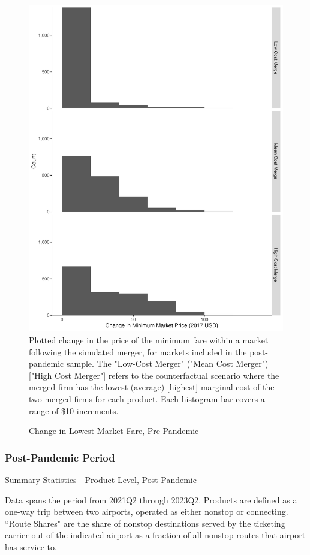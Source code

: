 \documentclass{article}
\begin{document}
\begin{appendices}
	
	\begin{figure}
		\caption{Change in Lowest Market Fare, Pre-Pandemic}
		\label{fig:LowestMarketChange_Pre}
		\includegraphics[width = \linewidth]{PrePandemic_Merger_Change_MinimumFare}
		\footnotesize{Plotted change in the price of the minimum fare within a market following the simulated merger, for markets included in the post-pandemic sample. The "Low-Cost Merger" ("Mean Cost Merger") ["High Cost Merger"] refers to the counterfactual scenario where the merged firm has the lowest (average) [highest] marginal cost of the two merged firms for each product. Each histogram bar covers a range of \$10 increments.}
	\end{figure}
	
	\FloatBarrier
	\subsubsection{Post-Pandemic Period}
		\begin{table}
		\caption{Summary Statistics - Product Level, Post-Pandemic}
		\label{tab:SummaryStatistics_Products_Post}
		
		\footnotesize{Data spans the period from 2021Q2 through 2023Q2. Products are defined as a one-way trip between two airports, operated as either nonstop or connecting. ``Route Shares" are the share of nonstop destinations served by the ticketing carrier out of the indicated airport as a fraction of all nonstop routes that airport has service to. }
	\end{table}
	

\end{appendices}
\end{document}
